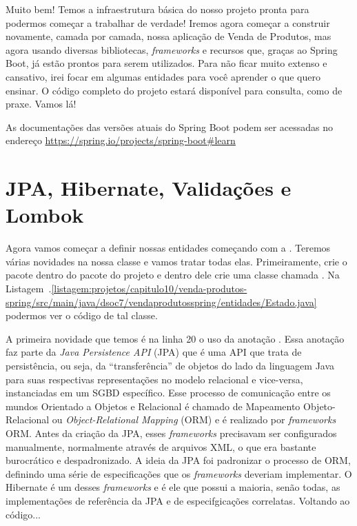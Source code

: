 Muito bem! Temos a infraestrutura básica do nosso projeto pronta para podermos começar a trabalhar de verdade! Iremos agora começar a construir novamente, camada por camada, nossa aplicação de Venda de Produtos, mas agora usando diversas bibliotecas, \textit{frameworks} e recursos que, graças ao Spring Boot, já estão prontos para serem utilizados. Para não ficar muito extenso e cansativo, irei focar em algumas entidades para você aprender o que quero ensinar. O código completo do projeto estará disponível para consulta, como de praxe. Vamos lá!

\begin{saibaMais}
    As documentações das versões atuais do Spring Boot podem ser acessadas no endereço \url{https://spring.io/projects/spring-boot#learn}
\end{saibaMais}

\section{JPA, Hibernate, Validações e Lombok}

Agora vamos começar a definir nossas entidades começando com a . Teremos várias novidades na nossa classe e vamos tratar todas elas. Primeiramente, crie o pacote  dentro do pacote  do projeto e dentro dele crie uma classe chamada . Na Listagem~\thechapter.\ref{listagem:projetos/capitulo10/venda-produtos-spring/src/main/java/dsoc7/vendaprodutosspring/entidades/Estado.java} podermos ver o código de tal classe.


A primeira novidade que temos é na linha 20 o uso da anotação . Essa anotação faz parte da \textit{Java Persistence API} (JPA) que é uma API que trata de persistência, ou seja, da ``transferência'' de objetos do lado da linguagem Java para suas respectivas representações no modelo relacional e vice-versa, instanciadas em um SGBD específico. Esse processo de comunicação entre os mundos Orientado a Objetos e Relacional é chamado de Mapeamento Objeto-Relacional ou \textit{Object-Relational Mapping} (ORM) e é realizado por \textit{frameworks} ORM. Antes da criação da JPA, esses \textit{frameworks} precisavam ser configurados manualmente, normalmente através de arquivos XML, o que era bastante burocrático e despadronizado. A ideia da JPA foi padronizar o processo de ORM, definindo uma série de especificações que os \textit{frameworks} deveriam implementar. O Hibernate é um desses \textit{frameworks} e é ele que possui a maioria, senão todas, as implementações de referência da JPA e de especifgicações correlatas. Voltando ao código...

